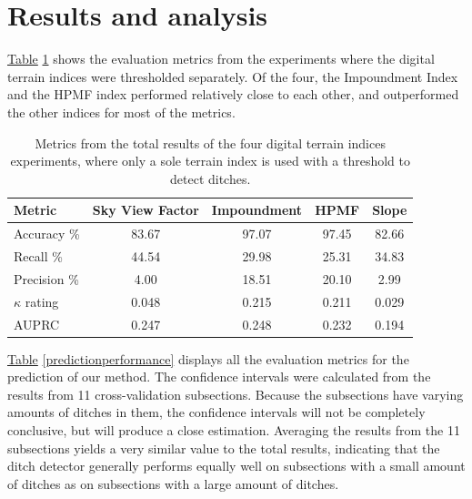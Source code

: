 \documentclass[11pt, review]{elsarticle} %
\begin{document}
\section{Results and analysis}

\hyperref[recreatedpredictionperformance]{Table} \ref{recreatedpredictionperformance} shows the evaluation metrics from the experiments where the digital terrain indices were thresholded separately. Of the four, the Impoundment Index and the HPMF index performed relatively close to each other, and outperformed the other indices for most of the metrics.

\begin{table}[!htb]
\centering
    {\begin{tabular}{l|cccc}
        \textbf{Metric} & \textbf{Sky View Factor} & \textbf{Impoundment} & \textbf{HPMF} & \textbf{Slope}\\
        \hline
        Accuracy \%     & 83.67 & 97.07 & 97.45 & 82.66 \\
        Recall \%       & 44.54 & 29.98 & 25.31 & 34.83 \\
        Precision \%    &{ 4.00}  & 18.51 & 20.10 & { 2.99} \\
        $\kappa$ rating & 0.048 & 0.215 & 0.211 & 0.029 \\
        AUPRC & 0.247 & 0.248 & 0.232 & 0.194 \\
        \hline
    \end{tabular}}
    \caption{Metrics from the total results of the four digital terrain indices experiments, where only a sole terrain index is used with a threshold to detect ditches.}
    \label{recreatedpredictionperformance}
\end{table}

\hyperref[predictionperformance]{Table} \ref{predictionperformance} displays all the evaluation metrics for the prediction of our method. The confidence intervals were calculated from the results from 11 cross-validation subsections. Because the subsections have varying amounts of ditches in them, the confidence intervals will not be completely conclusive, but will produce a close estimation. Averaging the results from the 11 subsections yields a very similar value to the total results, indicating that the ditch detector generally performs equally well on subsections with a small amount of ditches as on subsections with a large amount of ditches.
\end{document}

